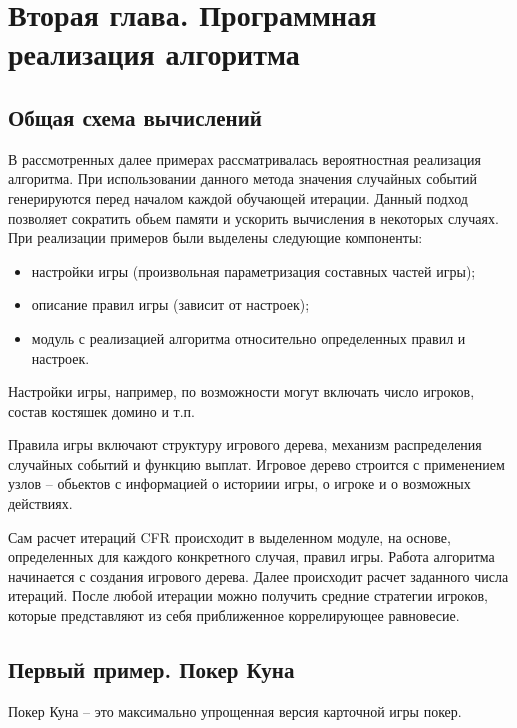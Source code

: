 \chapter{Вторая глава. Программная реализация алгоритма}
\label{cha:ch_2}
\section{Общая схема вычислений}

\par
В рассмотренных далее примерах рассматривалась вероятностная реализация алгоритма. При использовании данного метода значения случайных событий генерируются перед началом каждой обучающей итерации. Данный подход позволяет сократить обьем памяти и ускорить вычисления в некоторых случаях\cite{MCCFR}.
При реализации примеров были выделены следующие компоненты:
\begin{itemize}
	\item настройки игры (произвольная параметризация составных частей игры);
	\item описание правил игры (зависит от настроек);
	\item модуль с реализацией алгоритма относительно определенных правил и настроек.
\end{itemize}
\par
Настройки игры, например, по возможности могут включать число игроков, состав костяшек домино и т.п.
\par
Правила игры включают структуру игрового дерева, механизм распределения случайных событий и функцию выплат. Игровое дерево строится с применением узлов -- обьектов с информацией о историии игры, о игроке и о возможных действиях.
\par
Сам расчет итераций CFR происходит в выделенном модуле, на основе, определенных для каждого конкретного случая, правил игры. Работа алгоритма начинается с создания игрового дерева. Далее происходит расчет заданного числа итераций. После любой итерации можно получить средние стратегии игроков, которые представляют из себя приближенное коррелирующее равновесие.
\section{Первый пример. Покер Куна}

Покер Куна – это максимально упрощенная версия карточной игры покер\cite{KuhnPoker}.

